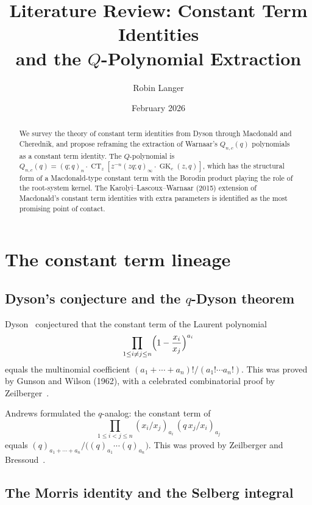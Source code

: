 \documentclass[11pt]{article}
\title{Literature Review: Constant Term Identities\\
and the $Q$-Polynomial Extraction}
\author{Robin Langer}
\date{February 2026}
\newcommand{\GK}{\operatorname{GK}}
\newcommand{\CT}{\operatorname{CT}}
\begin{document}
\maketitle

\begin{abstract}
We survey the theory of constant term identities from Dyson
through Macdonald and Cherednik, and propose reframing the
extraction of Warnaar's $Q_{n,c}(q)$ polynomials as a constant
term identity. The $Q$-polynomial is
$Q_{n,c}(q) = (q;q)_n \cdot \CT_z[z^{-n}(zq;q)_\infty
\cdot \GK_c(z,q)]$,
which has the structural form of a Macdonald-type constant term
with the Borodin product playing the role of the root-system
kernel. The Karolyi--Lascoux--Warnaar (2015) extension of
Macdonald's constant term identities with extra parameters is
identified as the most promising point of contact.
\end{abstract}

\section{The constant term lineage}
\label{sec:lineage}

\subsection{Dyson's conjecture and the $q$-Dyson theorem}

Dyson~\cite{dyson-1962} conjectured that the constant term of
the Laurent polynomial
\[
  \prod_{1 \le i \ne j \le n}
  \Bigl(1 - \frac{x_i}{x_j}\Bigr)^{a_i}
\]
equals the multinomial coefficient
$(a_1 + \cdots + a_n)! / (a_1! \cdots a_n!)$.
This was proved by Gunson and Wilson (1962), with a celebrated
combinatorial proof by Zeilberger~\cite{zeilberger-1982}.

Andrews formulated the $q$-analog: the constant term of
\[
  \prod_{1 \le i < j \le n}
  (x_i/x_j)_{a_i}\, (q\, x_j/x_i)_{a_j}
\]
equals $(q)_{a_1 + \cdots + a_n} / \bigl((q)_{a_1} \cdots
(q)_{a_n}\bigr)$. This was proved by Zeilberger and
Bressoud~\cite{zeilberger-bressoud-1985}.

\subsection{The Morris identity and the Selberg integral}
\end{document}
